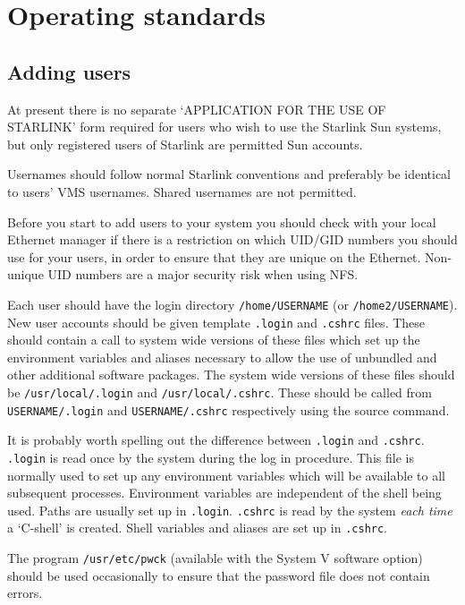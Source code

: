 \section{Operating standards}

\subsection{Adding users}

At present there is no separate `APPLICATION FOR THE USE OF STARLINK' form required
for users who wish to use the Starlink Sun systems, but only registered users
of Starlink are permitted Sun accounts. 

Usernames should follow normal Starlink conventions and preferably be identical
to users' VMS usernames.
Shared usernames are not permitted.  

Before you start to add users to your system you should check with your local
Ethernet manager if there is a restriction on which UID/GID numbers you should
use for your users, in order to ensure that they are unique on the Ethernet.
Non-unique UID numbers are a major security risk when using NFS.

Each user should have the login directory {\tt /home/USERNAME}
(or {\tt /home2/USERNAME}).
New user accounts should be given template {\tt .login} and {\tt .cshrc} files. These
should contain a call to system wide versions of these files which set up 
the environment variables and aliases necessary to allow the use of unbundled 
and other additional software packages. The system wide versions of these
files should be {\tt /usr/local/.login} and {\tt /usr/local/.cshrc}. These should be
called from {\tt USERNAME/.login} and {\tt USERNAME/.cshrc} respectively using the source command.

It is probably worth spelling out the difference between {\tt .login} and 
{\tt.cshrc}.
{\tt .login} is read once by the system during the log in procedure. This file is
normally used to set up any environment variables which will be available 
to all subsequent processes. Environment variables are independent of the
shell being used. Paths are usually set up in {\tt .login}.
{\tt .cshrc} is read by the system {\it each time}\, a `C-shell' is created.
Shell variables and aliases are set up in {\tt .cshrc}. 

The program {\tt /usr/etc/pwck} (available with the System V software option) should
be used occasionally to ensure that the password file does not contain errors.

